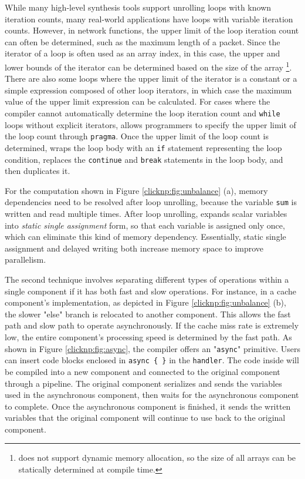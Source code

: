 While many high-level synthesis tools support unrolling loops with known iteration counts, many real-world applications have loops with variable iteration counts.
However, in network functions, the upper limit of the loop iteration count can often be determined, such as the maximum length of a packet.
Since the iterator of a loop is often used as an array index, in this case, the upper and lower bounds of the iterator can be determined based on the size of the array \footnote{\name{} does not support dynamic memory allocation, so the size of all arrays can be statically determined at compile time.}.
There are also some loops where the upper limit of the iterator is a constant or a simple expression composed of other loop iterators, in which case the maximum value of the upper limit expression can be calculated.
For cases where the compiler cannot automatically determine the loop iteration count and \texttt{while} loops without explicit iterators, \name allows programmers to specify the upper limit of the loop count through \texttt{pragma}.
Once the upper limit of the loop count is determined, \name wraps the loop body with an \texttt{if} statement representing the loop condition, replaces the \texttt{continue} and \texttt{break} statements in the loop body, and then duplicates it.

For the computation shown in Figure \ref {clicknp:fig:unbalance} (a), memory dependencies need to be resolved after loop unrolling, because the variable \texttt{sum} is written and read multiple times. After loop unrolling, \name expands scalar variables into \emph{static single assignment} form, so that each variable is assigned only once, which can eliminate this kind of memory dependency. Essentially, static single assignment and delayed writing both increase memory space to improve parallelism.

The second technique involves separating different types of operations within a single component if it has both fast and slow operations. For instance, in a cache component's implementation, as depicted in Figure \ref {clicknp:fig:unbalance} (b), the slower "else" branch is relocated to another component. This allows the fast path and slow path to operate asynchronously. If the cache miss rate is extremely low, the entire component's processing speed is determined by the fast path. As shown in Figure \ref{clicknp:fig:async}, the \name compiler offers an "\texttt{async}" primitive. Users can insert code blocks enclosed in \texttt{async \{ \}} in the \texttt{handler}. The code inside will be compiled into a new component and connected to the original component through a pipeline. The original component serializes and sends the variables used in the asynchronous component, then waits for the asynchronous component to complete. Once the asynchronous component is finished, it sends the written variables that the original component will continue to use back to the original component.

